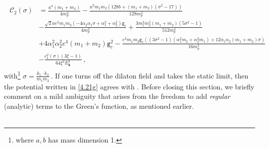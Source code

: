 \begin{align}
    \begin{split}
         \mathcal{C}_{2}(\sigma) &= \frac{a^4 \left(m_1+m_2\right)}{4 m_p^4}-\frac{a^2 m_1 m_2 \left(128 b+\left(m_1+m_2\right) \left(\sigma ^2-17\right)\right)}{128 m_p^4}\\
         & -\frac{\sqrt{2} a e^2 m_1 m_2 \left(-4 \alpha _2 \alpha _1 \sigma +\alpha _1^2+\alpha _2^2\right) \texttt{g}_c}{4 m_p^2}  +\frac{3 m_1^2 m_2^2 \left(m_1+m_2\right) \left(5 \sigma ^2-1\right)}{512 m_p^4} \\
         &+ 4 \alpha _1^2 \alpha _2^2 e^4 \left(m_1+m_2\right) \texttt{g}_c^2 -\frac{e^2 m_1 m_2 \texttt{g}_c \left(\left(3 \sigma ^2-1\right) \left(\alpha _1^2 m_2+\alpha _2^2 m_1\right)+12 \alpha _1 \alpha _2 \left(m_1+m_2\right) \sigma \right)}{16 m_p^2}\\
         & -\frac{c_1^2(\sigma)(3\xi-1)}{64\xi^2 E_{\boldsymbol{k}}^3  } \,,\label{4.21g}
    \end{split}
\end{align}
with{\footnote{where $a,b$ has mass dimension 1.}} $\sigma=\frac{k_1\cdot k_2}{m_1m_2}\,$. If one turns off the dilaton field and takes the static limit, then the potential written in \eqref{4.21g} agrees with \cite{Bjerrum-Bohr:2002aqa,Faller:2007sy}. Before closing this section, we briefly comment on a mild ambiguity that arises from the freedom to add \emph{regular} (analytic) terms to the Green's function, as mentioned earlier.\\\\
